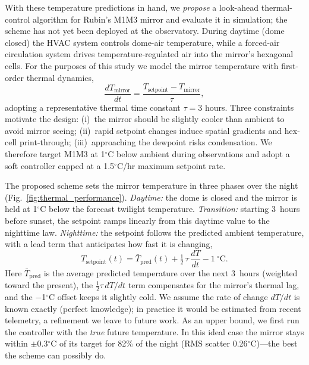 \documentclass[]{spie}  %
\newcommand{\degC}{$^{\circ}$C}
\begin{document}
With these temperature predictions in hand, we \emph{propose} a look-ahead thermal-control algorithm for Rubin's M1M3 mirror and evaluate it in simulation; the scheme has not yet been deployed at the observatory. During daytime (dome closed) the HVAC system controls dome-air temperature, while a forced-air circulation system drives temperature-regulated air into the mirror's hexagonal cells. For the purposes of this study we model the mirror temperature with first-order thermal dynamics,
\begin{equation}
\frac{dT_{\text{mirror}}}{dt} = \frac{T_{\text{setpoint}} - T_{\text{mirror}}}{\tau},
\label{eq:dynamics}
\end{equation}
adopting a representative thermal time constant $\tau = 3$ hours. Three constraints motivate the design: (i)~the mirror should be slightly cooler than ambient to avoid mirror seeing; (ii)~rapid setpoint changes induce spatial gradients and hex-cell print-through; (iii)~approaching the dewpoint risks condensation. We therefore target M1M3 at 1\degC{} below ambient during observations and adopt a soft controller capped at a 1.5\degC{}/hr maximum setpoint rate.

The proposed scheme sets the mirror temperature in three phases over the night (Fig.~\ref{fig:thermal_performance}). \emph{Daytime:} the dome is closed and the mirror is held at 1\degC{} below the forecast twilight temperature. \emph{Transition:} starting 3~hours before sunset, the setpoint ramps linearly from this daytime value to the nighttime law. \emph{Nighttime:} the setpoint follows the predicted ambient temperature, with a lead term that anticipates how fast it is changing,
\begin{equation}
T_{\text{setpoint}}(t) = \bar{T}_{\text{pred}}(t) + \tfrac{1}{2}\,\tau\,\frac{dT}{dt} - 1~^{\circ}\text{C}.
\label{eq:night}
\end{equation}
Here $\bar{T}_{\text{pred}}$ is the average predicted temperature over the next 3~hours (weighted toward the present), the $\tfrac{1}{2}\tau\,dT/dt$ term compensates for the mirror's thermal lag, and the $-$1\degC{} offset keeps it slightly cold. We assume the rate of change $dT/dt$ is known exactly (perfect knowledge); in practice it would be estimated from recent telemetry, a refinement we leave to future work. As an upper bound, we first run the controller with the \emph{true} future temperature. In this ideal case the mirror stays within $\pm$0.3\degC{} of its target for 82\% of the night (RMS scatter 0.26\degC{})---the best the scheme can possibly do.
\end{document}
